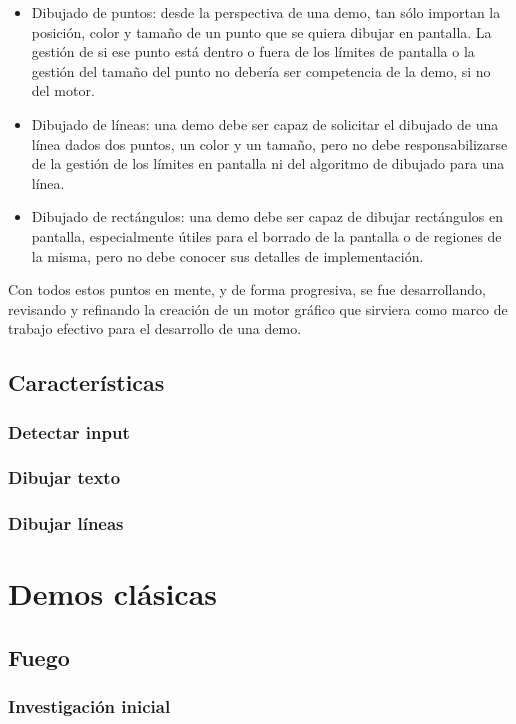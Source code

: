 \begin{itemize}
\begin{itemize}
			\item Dibujado de puntos: desde la perspectiva de una demo, tan sólo importan la posición, color y tamaño de un punto que se quiera dibujar en pantalla. La gestión de si ese punto está dentro o fuera de los límites de pantalla o la gestión del tamaño del punto no debería ser competencia de la demo, si no del motor.
			\item Dibujado de líneas: una demo debe ser capaz de solicitar el dibujado de una línea dados dos puntos, un color y un tamaño, pero no debe responsabilizarse de la gestión de los límites en pantalla ni del algoritmo de dibujado para una línea.
			\item Dibujado de rectángulos: una demo debe ser capaz de dibujar rectángulos en pantalla, especialmente útiles para el borrado de la pantalla o de regiones de la misma, pero no debe conocer sus detalles de implementación.
		\end{itemize}
\end{itemize}

Con todos estos puntos en mente, y de forma progresiva, se fue desarrollando, revisando y refinando la creación de un motor gráfico que sirviera como marco de trabajo efectivo para el desarrollo de una demo.

\section{Características}
\subsection{Detectar input}
\subsection{Dibujar texto}
\subsection{Dibujar líneas}

\chapter{Demos clásicas}

\section{Fuego}

\subsection{Investigación inicial}
